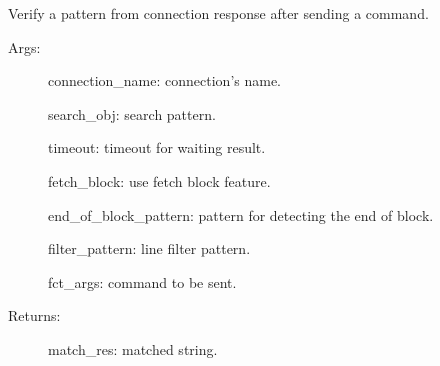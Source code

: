 \documentclass[letterpaper,10pt,english]{sphinxmanual}
\begin{document}
\begin{fulllineitems}
\begin{fulllineitems}
\end{fulllineitems}


\begin{fulllineitems}
\label{\detokenize{QConnectBase:QConnectBase.connection_manager.ConnectionManager.verify_unnamed_args}}
\sphinxAtStartPar
Verify a pattern from connection response after sending a command.
\begin{description}
\item[{Args:}] \leavevmode
\sphinxAtStartPar
connection\_name: connection’s name.

\sphinxAtStartPar
search\_obj: search pattern.

\sphinxAtStartPar
timeout: timeout for waiting result.

\sphinxAtStartPar
fetch\_block: use fetch block feature.

\sphinxAtStartPar
end\_of\_block\_pattern: pattern for detecting the end of block.

\sphinxAtStartPar
filter\_pattern: line filter pattern.

\sphinxAtStartPar
fct\_args: command to be sent.

\item[{Returns:}] \leavevmode
\sphinxAtStartPar
match\_res: matched string.

\end{description}

\end{fulllineitems}


\end{fulllineitems}

\end{document}
